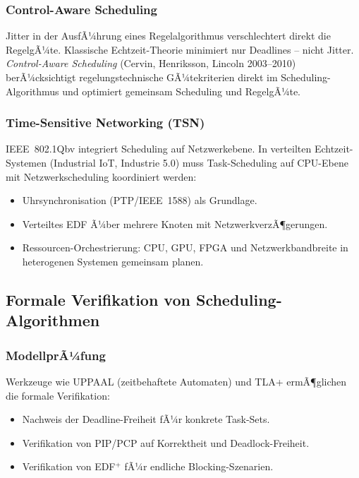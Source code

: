 ﻿\documentclass[a4paper,12pt]{report}
\theoremstyle{definition}
\begin{document}
\subsubsection{Control-Aware Scheduling}

Jitter in der AusfÃ¼hrung eines Regelalgorithmus verschlechtert direkt die
RegelgÃ¼te. Klassische Echtzeit-Theorie minimiert nur Deadlines -- nicht
Jitter. \emph{Control-Aware Scheduling} (Cervin, Henriksson, Lincoln 2003--2010)
berÃ¼cksichtigt regelungstechnische GÃ¼tekriterien direkt im Scheduling-Algorithmus
und optimiert gemeinsam Scheduling und RegelgÃ¼te.

\subsubsection{Time-Sensitive Networking (TSN)}

IEEE~802.1Qbv integriert Scheduling auf Netzwerkebene. In verteilten
Echtzeit-Systemen (Industrial IoT, Industrie 5.0) muss Task-Scheduling auf
CPU-Ebene mit Netzwerkscheduling koordiniert werden:
\begin{itemize}
	\item Uhrsynchronisation (PTP/IEEE~1588) als Grundlage.
	\item Verteiltes EDF Ã¼ber mehrere Knoten mit NetzwerkverzÃ¶gerungen.
	\item Ressourcen-Orchestrierung: CPU, GPU, FPGA und Netzwerkbandbreite
	      in heterogenen Systemen gemeinsam planen.
\end{itemize}

\subsection{Formale Verifikation von Scheduling-Algorithmen}

\subsubsection{ModellprÃ¼fung}

Werkzeuge wie UPPAAL (zeitbehaftete Automaten) und TLA+ ermÃ¶glichen die
formale Verifikation:
\begin{itemize}
	\item Nachweis der Deadline-Freiheit fÃ¼r konkrete Task-Sets.
	\item Verifikation von PIP/PCP auf Korrektheit und Deadlock-Freiheit.
	\item Verifikation von EDF$^+$ fÃ¼r endliche Blocking-Szenarien.
\end{itemize}
\end{document}
